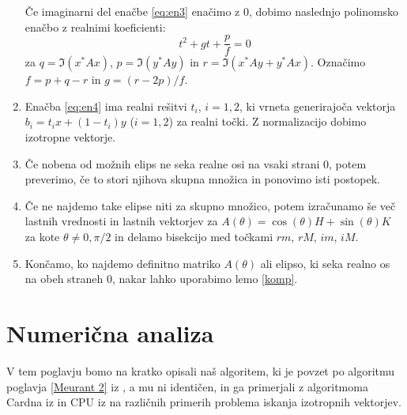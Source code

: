 \documentclass[12pt,a4paper]{amsart}
\theoremstyle{definition}
\theoremstyle{plain}
\begin{document}
\begin{enumerate}[1.]
Če imaginarni del enačbe \eqref{eq:en3} enačimo z 0, dobimo naslednjo polinomsko enačbo z realnimi koeficienti:
\begin{equation}
t^2+gt+\frac{p}{f}=0 \label{eq:en4}
\end{equation}
za $q=\Im(x^\ast Ax)$, $p=\Im(y^\ast Ay)$ in $r=\Im(x^\ast  Ay + y^\ast Ax)$. Označimo $f=p+q-r$ in $g=(r-2p)/f$.
\item  Enačba \eqref{eq:en4} ima realni rešitvi $t_i$, $i=1,2$, ki vrneta generirajoča vektorja $b_i=t_ix+(1-t_i)y$ ($i=1,2$) za realni točki. Z normalizacijo dobimo izotropne vektorje. %
\item Če nobena od možnih elips ne seka realne osi na vsaki strani 0, potem preverimo, če to stori njihova skupna množica in ponovimo isti postopek.
\item Če ne najdemo take elipse niti za skupno množico, potem izračunamo še več lastnih vrednosti in lastnih vektorjev za $A(\theta)=\cos(\theta)H+\sin(\theta)K$ za kote $\theta \not =0,\pi/2$ in delamo bisekcijo med točkami $rm$, $rM$, $im$, $iM$.
\item Končamo, ko najdemo definitno matriko $A(\theta)$ ali elipso, ki seka realno os na obeh straneh 0, nakar lahko uporabimo lemo \ref{komp}.
\end{enumerate}
\section{Numerična analiza}
V tem poglavju bomo na kratko opisali naš algoritem, ki je povzet po algoritmu poglavja \ref{Meurant 2} iz \cite{meurant}, a mu ni identičen, in ga primerjali z algoritmoma Cardna iz \cite{carden_alg} in CPU iz \cite{trije_alg} na različnih primerih problema iskanja izotropnih vektorjev. 
\end{document}
